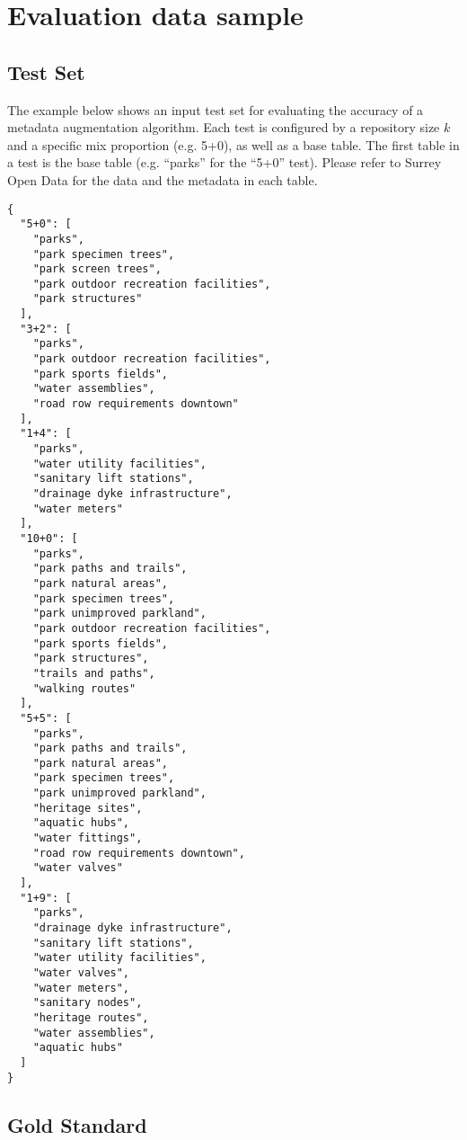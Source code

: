 \chapter{Evaluation data sample}

\section{Test Set}
\label{sec:TestSet}

The example below shows an input test set for evaluating the accuracy of a metadata augmentation algorithm. Each test is configured by a repository size $k$ and a specific mix proportion (e.g. 5+0), as well as a base table. The first table in a test is the base table (e.g. “parks” for the “5+0” test). Please refer to Surrey Open Data for the data and the metadata in each table.

\begin{lstlisting}
{
  "5+0": [
    "parks",
    "park specimen trees",
    "park screen trees",
    "park outdoor recreation facilities",
    "park structures"
  ],
  "3+2": [
    "parks",
    "park outdoor recreation facilities",
    "park sports fields",
    "water assemblies",
    "road row requirements downtown"
  ],
  "1+4": [
    "parks",
    "water utility facilities",
    "sanitary lift stations",
    "drainage dyke infrastructure",
    "water meters"
  ],
  "10+0": [
    "parks",
    "park paths and trails",
    "park natural areas",
    "park specimen trees",
    "park unimproved parkland",
    "park outdoor recreation facilities",
    "park sports fields",
    "park structures",
    "trails and paths",
    "walking routes"
  ],
  "5+5": [
    "parks",
    "park paths and trails",
    "park natural areas",
    "park specimen trees",
    "park unimproved parkland",
    "heritage sites",
    "aquatic hubs",
    "water fittings",
    "road row requirements downtown",
    "water valves"
  ],
  "1+9": [
    "parks",
    "drainage dyke infrastructure",
    "sanitary lift stations",
    "water utility facilities",
    "water valves",
    "water meters",
    "sanitary nodes",
    "heritage routes",
    "water assemblies",
    "aquatic hubs"
  ]
}
\end{lstlisting}

\section{Gold Standard}
\label{sec:Gold Standard}

